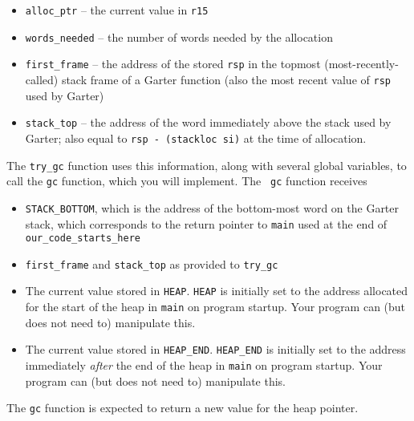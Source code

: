 \documentclass[10pt, oneside]{article}
\begin{document}
\begin{itemize}
\item {\tt alloc\_ptr} -- the current value in {\tt r15}
\item {\tt words\_needed} -- the number of words needed by the allocation
\item {\tt first\_frame} -- the address of the stored {\tt rsp} in the
topmost (most-recently-called) stack frame of a Garter function (also the
most recent value of {\tt rsp} used by Garter)
\item {\tt stack\_top} -- the address of the word immediately above the stack
used by Garter; also equal to {\tt rsp - (stackloc si)} at the time of allocation.
\end{itemize}

The {\tt try\_gc} function uses this information, along with several global
variables, to call the {\tt gc} function, which you will implement. The {\tt
gc} function receives

\begin{itemize}
\item {\tt STACK\_BOTTOM}, which is the address of the bottom-most word on
the Garter stack, which corresponds to the return pointer to {\tt main} used
at the end of {\tt our\_code\_starts\_here}
\item {\tt first\_frame} and {\tt stack\_top} as provided to {\tt try\_gc}
\item The current value stored in {\tt HEAP}. {\tt HEAP} is initially set to
the address allocated for the start of the heap in {\tt main} on program
startup. Your program can (but does not need to) manipulate this.
\item The current value stored in {\tt HEAP\_END}. {\tt HEAP\_END} is initially set to
the address immediately {\it after} the end of the heap in {\tt main} on
program startup. Your program can (but does not need to) manipulate this.
\end{itemize}

The {\tt gc} function is expected to return a new value for the heap pointer.
\end{document}
